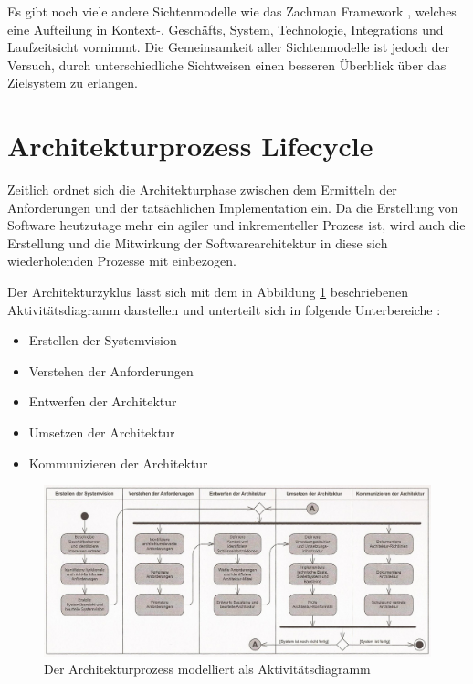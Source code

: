 Es gibt noch viele andere Sichtenmodelle wie das Zachman Framework \cite[S. 282]{zachman}, welches eine Aufteilung in Kontext-, Geschäfts, System, Technologie, Integrations und Laufzeitsicht vornimmt. Die Gemeinsamkeit aller Sichtenmodelle ist jedoch der Versuch, durch unterschiedliche Sichtweisen einen besseren Überblick über das Zielsystem zu erlangen.



\section{Architekturprozess Lifecycle}
Zeitlich ordnet sich die Architekturphase zwischen dem Ermitteln der Anforderungen und der tatsächlichen Implementation ein. Da die Erstellung von Software heutzutage mehr ein agiler und inkrementeller Prozess ist, wird auch die Erstellung und die Mitwirkung der Softwarearchitektur in diese sich wiederholenden Prozesse mit einbezogen. \cite[S. 7]{basiswissen}

Der Architekturzyklus lässt sich mit dem in Abbildung \ref{fig:cycle} beschriebenen Aktivitätsdiagramm darstellen und unterteilt sich in folgende Unterbereiche \cite[Umschlag]{softarch}:

\begin{itemize}
  \item \glqq Erstellen der Systemvision\grqq
  \item \glqq Verstehen der Anforderungen\grqq
  \item \glqq Entwerfen der Architektur\grqq
  \item \glqq Umsetzen der Architektur\grqq
  \item \glqq Kommunizieren der Architektur\grqq
\end{itemize}


\begin{figure}[H]
    \centering
    \includegraphics[scale=0.8]{img/archcycle.png}
    \caption{Der Architekturprozess modelliert als Aktivitätsdiagramm \cite[Umschlag]{softarch}}
    \label{fig:cycle}
\end{figure}

